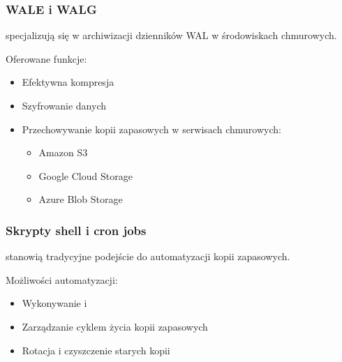 \documentclass[letterpaper,10pt,polish]{sphinxmanual}
\begin{document}
\subsubsection{WAL\sphinxhyphen{}E i WAL\sphinxhyphen{}G}
\label{\detokenize{rozdzial2/Kopie_zapasowe_i_odzyskiwanie_danych/kopie_zapasowe_i_odzyskiwanie_danych:wal-e-i-wal-g}}
\sphinxAtStartPar
{} specjalizują się w archiwizacji dzienników WAL w środowiskach chmurowych.

\sphinxAtStartPar
Oferowane funkcje:
\begin{itemize}
\item {} 
\sphinxAtStartPar
Efektywna kompresja

\item {} 
\sphinxAtStartPar
Szyfrowanie danych

\item {} 
\sphinxAtStartPar
Przechowywanie kopii zapasowych w serwisach chmurowych:
\begin{itemize}
\item {} 
\sphinxAtStartPar
Amazon S3

\item {} 
\sphinxAtStartPar
Google Cloud Storage

\item {} 
\sphinxAtStartPar
Azure Blob Storage

\end{itemize}

\end{itemize}


\subsubsection{Skrypty shell i cron jobs}
\label{\detokenize{rozdzial2/Kopie_zapasowe_i_odzyskiwanie_danych/kopie_zapasowe_i_odzyskiwanie_danych:skrypty-shell-i-cron-jobs}}
\sphinxAtStartPar
{} stanowią tradycyjne podejście do automatyzacji kopii zapasowych.

\sphinxAtStartPar
Możliwości automatyzacji:
\begin{itemize}
\item {} 
\sphinxAtStartPar
Wykonywanie  i 

\item {} 
\sphinxAtStartPar
Zarządzanie cyklem życia kopii zapasowych

\item {} 
\sphinxAtStartPar
Rotacja i czyszczenie starych kopii

\end{itemize}
\end{document}

